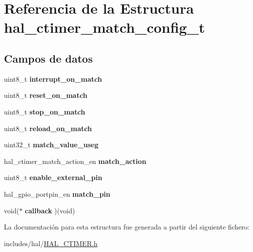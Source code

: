 \hypertarget{structhal__ctimer__match__config__t}{}\section{Referencia de la Estructura hal\+\_\+ctimer\+\_\+match\+\_\+config\+\_\+t}
\label{structhal__ctimer__match__config__t}
\subsection*{Campos de datos}
\begin{DoxyCompactItemize}
\item 
\mbox{\label{structhal__ctimer__match__config__t_ab259e172d706bc2e9d418ff1bb477f97}} 
uint8\+\_\+t {\bfseries interrupt\+\_\+on\+\_\+match}
\item 
\mbox{\label{structhal__ctimer__match__config__t_a378a0bfd1f48031d9a015eb5a1874375}} 
uint8\+\_\+t {\bfseries reset\+\_\+on\+\_\+match}
\item 
\mbox{\label{structhal__ctimer__match__config__t_a4265e678767bbef24a362a7932d1caee}} 
uint8\+\_\+t {\bfseries stop\+\_\+on\+\_\+match}
\item 
\mbox{\label{structhal__ctimer__match__config__t_abb9ce991542ef721bd1984e9effb42bf}} 
uint8\+\_\+t {\bfseries reload\+\_\+on\+\_\+match}
\item 
\mbox{\label{structhal__ctimer__match__config__t_a03037f1d1c1d50fcf441839c45db69ca}} 
uint32\+\_\+t {\bfseries match\+\_\+value\+\_\+useg}
\item 
\mbox{\label{structhal__ctimer__match__config__t_a0e61bad97ad0b9d14d13c61fede5c561}} 
hal\+\_\+ctimer\+\_\+match\+\_\+action\+\_\+en {\bfseries match\+\_\+action}
\item 
\mbox{\label{structhal__ctimer__match__config__t_acd106fdd0414fb272e5db2431223bd72}} 
uint8\+\_\+t {\bfseries enable\+\_\+external\+\_\+pin}
\item 
\mbox{\label{structhal__ctimer__match__config__t_ae80e412bd942c5b8e7b17565e96609bc}} 
hal\+\_\+gpio\+\_\+portpin\+\_\+en {\bfseries match\+\_\+pin}
\item 
\mbox{\label{structhal__ctimer__match__config__t_a00591ee488dcbfef6b73ae9e2f216829}} 
void($\ast$ {\bfseries callback} )(void)
\end{DoxyCompactItemize}


La documentación para esta estructura fue generada a partir del siguiente fichero\+:\begin{DoxyCompactItemize}
\item 
includes/hal/\hyperlink{HAL__CTIMER_8h}{H\+A\+L\+\_\+\+C\+T\+I\+M\+E\+R.\+h}\end{DoxyCompactItemize}
